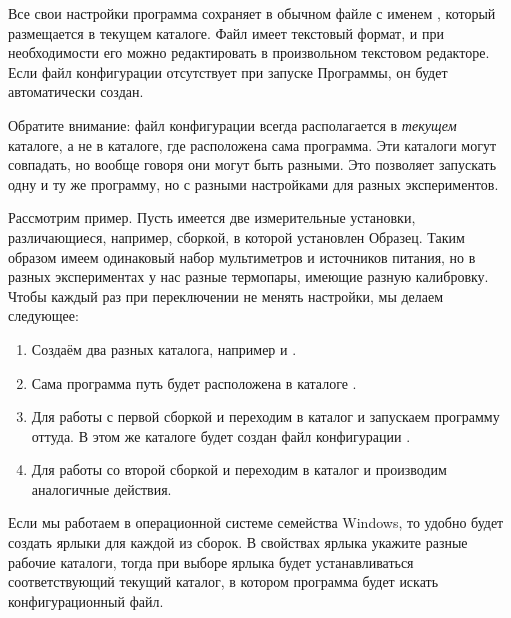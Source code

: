 Все свои настройки программа сохраняет в обычном файле с именем , который размещается в текущем каталоге. Файл имеет текстовый формат, и при необходимости его можно редактировать в произвольном текстовом редакторе. Если файл конфигурации отсутствует при запуске Программы, он будет автоматически создан.

Обратите внимание: файл конфигурации всегда располагается в {\it текущем} каталоге, а не в каталоге, где расположена сама программа. Эти каталоги могут совпадать, но вообще говоря они могут быть разными. Это позволяет запускать одну и ту же программу, но с разными настройками для разных экспериментов.

Рассмотрим пример. Пусть имеется две измерительные установки, различающиеся, например, сборкой, в которой установлен Образец. Таким образом имеем одинаковый набор мультиметров и источников питания, но в разных экспериментах у нас разные термопары, имеющие разную калибровку. Чтобы каждый раз при переключении не менять настройки, мы делаем следующее:

\begin{enumerate}
\item Создаём два разных каталога, например  и .

\item Сама программа путь будет расположена в каталоге .

\item Для работы с первой сборкой и переходим в каталог  и запускаем программу оттуда. В этом же каталоге будет создан файл конфигурации .

\item Для работы со второй сборкой и переходим в каталог  и производим аналогичные действия.

\end{enumerate}

Если мы работаем в операционной системе семейства Windows, то удобно будет создать ярлыки для каждой из сборок. В свойствах ярлыка укажите разные рабочие каталоги, тогда при выборе ярлыка будет устанавливаться соответствующий текущий каталог, в котором программа будет искать конфигурационный файл.
